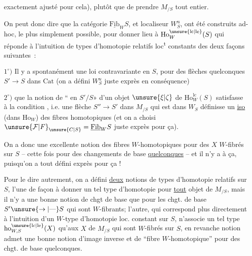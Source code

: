 exactement ajusté pour cela), plutôt que de prendre $M_{/S}$ tout entier.

On peut donc dire que la catégorie $\underline{\mathrm{Fib}}_W S$, et  localiseur $W_S^u$, ont été construits ad-hoc, le plus simplement possible, pour donner lieu à  $\mathrm{Ho}^{\unsure{\mathrm{lc}|\mathrm{le}}}_W(S)$ qui  réponde à l'intuition de types d'homotopie relatifs loc\textsuperscript{t} constants des deux façons suivantes~:

$1^{\circ})$ Il y a spontanément une loi contravariante en $S$, pour des flèches quelconques  $S'\to S$ dans $\mathrm{Cat}$ (on a défini $W_S^u$ juste exprès en conséquence)

$2^{\circ})$ que la notion de ``  en $S'/S$» d'un objet $\unsure{\xi|\zeta}$ de $\mathrm{Ho}^{\mathrm{lc}}_W(S)$ satisfasse à la condition , i.e. une flèche $S''\to S'$ dans $M_{/S}$ qui est dans $W_S$ définisse un \uline{iso} (dans $\mathrm{Ho}_W$) des fibres homotopiques
(et on a choisi $\unsure{\mathcal{F}|F}_{\unsure{C|S}}=\underline{\mathrm{Fib}}_W S$ juste exprès pour ça).

On a donc une excellente notion des fibres $W$-homotopiques pour des $X$ $W$-fibrés sur $S$ -- cette fois  pour des changements de base \uline{quelconques} -- et il n'y a  à ça, puisqu'on a tout défini exprès pour ça !

Pour le dire autrement, on a défini \uline{deux} notions de types d'homotopie relatifs sur $S$, l'une de façon à donner un tel type d'homotopie  pour \uline{tout} objet de $M_{/S}$, mais il n'y a  une bonne notion de chgt de base que pour les chgt. de base $S'\unsure{\to|\text{---}}S$ qui sont $W$-fibrants; l'autre, qui correspond plus directement à l'intuition d'un $W$-type d'homotopie loc. constant sur $S$, n'associe un tel type $\mathrm{ho}^{\unsure{\mathrm{lc}|\mathrm{le}}}_{W,S}(X)$ qu'aux $X$ de $M_{/S}$ qui sont $W$-fibrés sur $S$, en revanche  notion admet une bonne notion d'image inverse et de ``fibre $W$-homotopique'' pour des chgt. de base quelconques.

